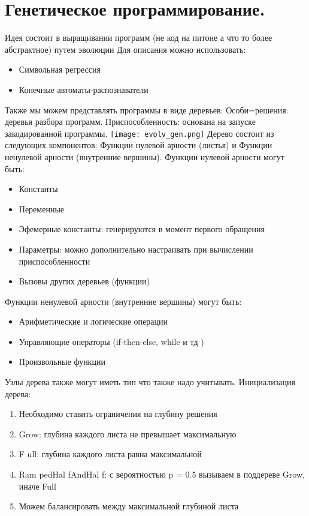 \section{Генетическое программирование.}
Идея состоит в выращивании программ (не код на питоне а что то более абстрактное) путем эволюции
Для описания можно использовать:
\begin{itemize}
\item Символьная регрессия
\item Конечные автоматы-распознаватели
\end{itemize}
Также мы можем представлять программы в виде деревьев:
Особи=решения: деревья разбора программ. Приспособленность: основана на запуске закодированной программы. 
\texttt{[image: evolv\_gen.png]}
Дерево состоит из следующих компонентов: Функции нулевой арности (листья) и Функции ненулевой арности (внутренние вершины).
Функции нулевой арности могут быть:
\begin{itemize}
	\item Константы
	\item Переменные
	\item Эфемерные константы: генерируются в момент первого обращения
	\item Параметры: можно дополнительно настраивать при вычислении приспособленности
	\item Вызовы других деревьев (функции)
\end{itemize}
Функции ненулевой арности (внутренние вершины) могут быть:
\begin{itemize}
	\item Арифметические и логические операции
	\item Управляющие операторы (if-then-else, while и тд )
	\item Произвольные функции
\end{itemize}
Узлы дерева также могут иметь тип что также надо учитывать. 
Инициализация дерева:
\begin{enumerate} 
	\item Необходимо ставить ограничения на глубину решения 
	\item Grow: глубина каждого листа не превышает максимальную
	\item F ull: глубина каждого листа равна максимальной
	\item Ram pedHal fAndHal f: с вероятностью p = 0.5 вызываем в поддереве Grow, иначе Full
	\item Можем балансировать между максимальной глубиной листа
\end{enumerate} 
